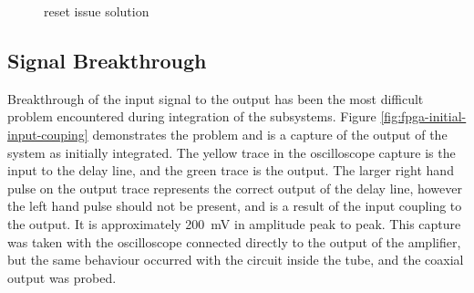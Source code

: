 \begin{figure}[ht]
	\centering
	\caption{ reset issue solution}
	\label{fig:fpga-reset-sol}
\end{figure}


\subsection{Signal Breakthrough} \label{sec:signal-breakthrough}
Breakthrough of the input signal to the output has been the most difficult problem encountered during integration of the subsystems. Figure \ref{fig:fpga-initial-input-couping} demonstrates the problem and is a capture of the output of the system as initially integrated. The yellow trace in the oscilloscope capture is the input to the delay line, and the green trace is the output. The larger right hand pulse on the output trace represents the correct output of the delay line, however the left hand pulse should not be present, and is a result of the input coupling to the output. It is approximately \SI{200}{\milli\volt} in amplitude peak to peak. This capture was taken with the oscilloscope connected directly to the output of the amplifier, but the same behaviour occurred with the circuit inside the tube, and the coaxial output was probed.

